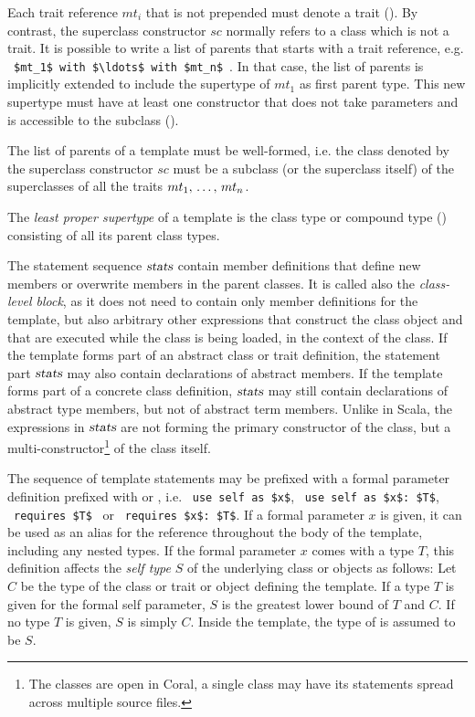 Each trait reference $mt_i$ that is not prepended must denote a trait (). By contrast, the superclass constructor $sc$ normally refers to a class which is not a trait. It is possible to write a list of parents that starts with a trait reference, e.g. ~\lstinline!$mt_1$ with $\ldots$ with $mt_n$!~. In that case, the list of parents is implicitly extended to include the supertype of $mt_1$ as first parent type. This new supertype must have at least one constructor that does not take parameters and is accessible to the subclass (). 

The list of parents of a template must be well-formed, i.e. the class denoted by the superclass constructor $sc$ must be a subclass (or the superclass itself) of the superclasses of all the traits $mt_1 ,\, \ldots ,\, mt_n$. 

The {\em least proper supertype} of a template is the class type or compound type () consisting of all its parent class types. 

The statement sequence $\mbox{\sl stats}$ contain member definitions that define new members or overwrite members in the parent classes. It is called also the {\em class-level block}, as it does not need to contain only member definitions for the template, but also arbitrary other expressions that construct the class object and that are executed while the class is being loaded, in the context of the class. If the template forms part of an abstract class or trait definition, the statement part $\mbox{\sl stats}$ may also contain declarations of abstract members. If the template forms part of a concrete class definition, $\mbox{\sl stats}$ may still contain declarations of abstract type members, but not of abstract term members. Unlike in Scala, the expressions in $\mbox{\sl stats}$ are not forming the primary constructor of the class, but a multi-constructor\footnote{The classes are open in Coral, a single class may have its statements spread across multiple source files.} of the class itself. 

The sequence of template statements may be prefixed with a formal parameter definition prefixed with  or , i.e. ~\lstinline!use self as $x$!, ~\lstinline!use self as $x$: $T$!, ~\lstinline!requires $T$!~ or ~\lstinline!requires $x$: $T$!. If a formal parameter $x$ is given, it can be used as an alias for the reference  throughout the body of the template, including any nested types. If the formal parameter $x$ comes with a type $T$, this definition affects the {\em self type} $S$ of the underlying class or objects as follows: Let $C$ be the type of the class or trait or object defining the template. If a type $T$ is given for the formal self parameter, $S$ is the greatest lower bound of $T$ and $C$. If no type $T$ is given, $S$ is simply $C$. Inside the template, the type of  is assumed to be $S$. 

